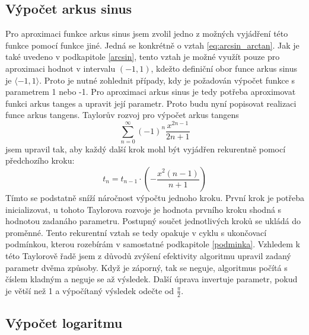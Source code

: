 \documentclass[12pt,a4paper,titlepage,final]{article}
\begin{document}
\subsection{Výpočet arkus sinus}

Pro aproximaci funkce arkus sinus jsem zvolil jedno z možných vyjádření této
funkce pomocí funkce jiné. Jedná se konkrétně o vztah \ref{eq:arcsin_arctan}.
Jak je také uvedeno v podkapitole \ref{arcsin}, tento vztah je možné využít
pouze pro aproximaci hodnot v intervalu $(-1, 1)$, kdežto definiční obor funce
arkus sinus je $\langle-1,1\rangle$. Proto je nutné zohlednit případy, kdy je
požadován výpočet funkce s parametrem 1 nebo -1. Pro aproximaci arkus sinus
je tedy potřeba aproximovat funkci arkus tanges a upravit její parametr.
Proto budu nyní popisovat realizaci funce arkus tangens. Taylorův rozvoj pro
výpočet arkus tangens \cite{vzorce}
\begin{equation}\label{eq:taylor_tangens}
\sum_{n=0}^{\infty }(-1)^{n}\frac{x^{2n-1}}{2n+1}
\end{equation}
jsem upravil tak, aby každý další krok mohl být vyjádřen rekurentně pomocí
předchozího kroku:
\begin{equation}\label{eq:rekur_tangens}
t_{n}=t_{n-1}\cdot (-\frac{x^{2}(n-1)}{n+1})
\end{equation}
Tímto se podstatně sníží náročnost výpočtu jednoho kroku. První krok je potřeba
inicializovat, u tohoto Taylorova rozvoje je hodnota prvního kroku shodná s
hodnotou zadanáho parametru. Postupný součet jednotlivých kroků se ukládá
do proměnné. Tento rekurentní vztah se tedy opakuje v cyklu s ukončovací
podmínkou, kterou rozebírám v samostatné podkapitole \ref{podminka}.
Vzhledem k této Taylorově řadě jsem z důvodů zvýšení efektivity algoritmu
upravil zadaný parametr dvěma způsoby. Když je záporný, tak se neguje,
algoritmus počítá s číslem kladným a neguje se až výsledek. Další úprava
invertuje parametr, pokud je větší než 1 a výpočítaný výsledek odečte od
$\frac{\pi}{2}$.

\subsection{Výpočet logaritmu}
\end{document}
